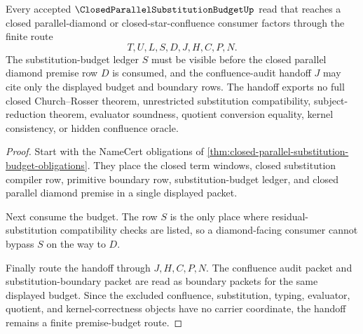 \begin{theorem}
\label{thm:closed-parallel-substitution-budget-diamond-handoff}
Every accepted $\ClosedParallelSubstitutionBudgetUp$ read that reaches a closed parallel-diamond or closed-star-confluence consumer factors through the finite route
$$
T,U,L,S,D,J,H,C,P,N .
$$
The substitution-budget ledger $S$ must be visible before the closed parallel diamond premise row $D$ is consumed, and the confluence-audit handoff $J$ may cite only the displayed budget and boundary rows. The handoff exports no full closed Church--Rosser theorem, unrestricted substitution compatibility, subject-reduction theorem, evaluator soundness, quotient conversion equality, kernel consistency, or hidden confluence oracle.
\end{theorem}
\begin{proof}
Start with the NameCert obligations of \autoref{thm:closed-parallel-substitution-budget-obligations}. They place the closed term windows, closed substitution compiler row, primitive boundary row, substitution-budget ledger, and closed parallel diamond premise in a single displayed packet.

Next consume the budget. The row $S$ is the only place where residual-substitution compatibility checks are listed, so a diamond-facing consumer cannot bypass $S$ on the way to $D$.

Finally route the handoff through $J,H,C,P,N$. The confluence audit packet and substitution-boundary packet are read as boundary packets for the same displayed budget. Since the excluded confluence, substitution, typing, evaluator, quotient, and kernel-correctness objects have no carrier coordinate, the handoff remains a finite premise-budget route.
\end{proof}



